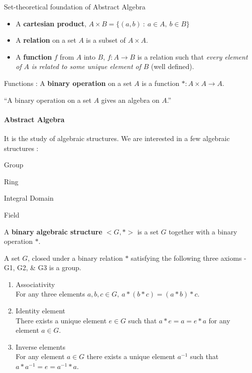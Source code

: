 \begin{definition}Set-theoretical foundation of Abstract Algebra
	\begin{itemize}
		\item A \textbf{cartesian product}, $A \times B = \{ (a,b) \ : \ a \in A,\ b \in B \}$%
		\item A \textbf{relation} on a set $A$ is a subset of $A \times A$.%
		\item A \textbf{function} $f$ from $A$ into $B$,
			$f : A \to B$ is a relation such that \textit{every element of $A$ is related to some unique element of $B$}
			(well defined).%
	\end{itemize}
\end{definition}

\begin{definition} Functions :
	A \textbf{binary operation} on a set $A$ is a function $\ast : A \times A \to A$.%
\end{definition}

``A binary operation on a set $A$ gives an algebra on $A$.''%
\begin{story}
\paragraph{Abstract Algebra}
	It is the study of algebraic structures.
	We are interested in a few algebraic structures :
	\begin{enumerate*}
		\item Group
		\item Ring
		\item Integral Domain
		\item Field
	\end{enumerate*}
\end{story}

\begin{definition}
	A \textbf{binary algebraic structure} $<\!G,\ast\!>$ is a set $G$ together with a binary operation $\ast$.
\end{definition}

\begin{definition}[Group]
	A set $G$, closed under a binary relation $\ast$ satisfying the following three axioms -G1, G2, \& G3 is a group.%
\begin{enumerate}[label=G\arabic*]
	\item Associativity \\
		For any three elements $a,b,c \in G,\ a \ast (b \ast c) = (a \ast b) \ast c$.
	\item Identity element\\
		There exists a unique element $e \in G$ such that $a \ast e = a = e \ast a$ for any element $a \in G$.
	\item Inverse elements\\
		For any element $a \in G$ there exists a unique element $a^{-1}$ such that $a \ast a^{-1} = e = a^{-1} \ast a$.
\end{enumerate}
\end{definition}


